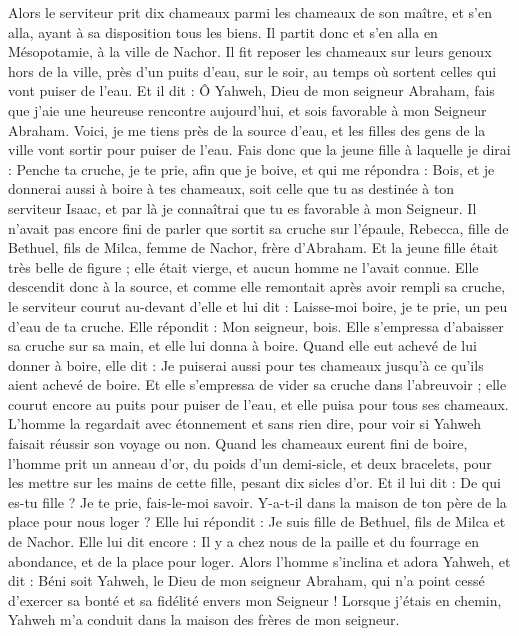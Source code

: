 \begin{multicols}{2}
Alors le serviteur prit dix chameaux parmi les chameaux de son maître, et s'en alla, ayant à sa disposition tous les biens. Il partit donc et s'en alla en Mésopotamie, à la ville de Nachor.
Il fit reposer les chameaux sur leurs genoux hors de la ville, près d'un puits d'eau, sur le soir, au temps où sortent celles qui vont puiser de l'eau.
Et il dit : Ô Yahweh, Dieu de mon seigneur Abraham, fais que j'aie une heureuse rencontre aujourd'hui, et sois favorable à mon Seigneur Abraham.
Voici, je me tiens près de la source d'eau, et les filles des gens de la ville vont sortir pour puiser de l'eau.
Fais donc que la jeune fille à laquelle je dirai : Penche ta cruche, je te prie, afin que je boive, et qui me répondra : Bois, et je donnerai aussi à boire à tes chameaux, soit celle que tu as destinée à ton serviteur Isaac, et par là je connaîtrai que tu es favorable à mon Seigneur.
Il n’avait pas encore fini de parler que sortit sa cruche sur l’épaule, Rebecca, fille de Bethuel, fils de Milca, femme de Nachor, frère d'Abraham.
Et la jeune fille était très belle de figure ; elle était vierge, et aucun homme ne l'avait connue. Elle descendit donc à la source, et comme elle remontait après avoir rempli sa cruche,
le serviteur courut au-devant d'elle et lui dit : Laisse-moi boire, je te prie, un peu d’eau de ta cruche.
Elle répondit : Mon seigneur, bois. Elle s’empressa d’abaisser sa cruche sur sa main,  et elle lui donna à boire.
Quand elle eut achevé de lui donner à boire, elle dit : Je puiserai aussi pour tes chameaux jusqu'à ce qu'ils aient achevé de boire.
Et elle s’empressa de vider sa cruche dans l’abreuvoir ; elle courut encore au puits pour puiser de l'eau, et elle puisa pour tous ses chameaux.
L’homme la regardait avec étonnement et sans rien dire, pour voir si Yahweh faisait réussir son voyage ou non.
Quand les chameaux eurent fini de boire, l’homme prit un anneau d'or, du poids d'un demi-sicle, et deux bracelets, pour les mettre sur les mains de cette fille, pesant dix sicles d'or.
Et il lui dit : De qui es-tu fille ? Je te prie, fais-le-moi savoir. Y-a-t-il dans la maison de ton père de la place pour nous loger ?
Elle lui répondit : Je suis fille de Bethuel, fils de Milca et de Nachor.
Elle lui dit encore : Il y a chez nous de la paille et du fourrage en abondance, et de la place pour loger.
Alors l’homme s'inclina et adora Yahweh,
et dit : Béni soit Yahweh, le Dieu de mon seigneur Abraham, qui n'a point cessé d'exercer sa bonté et sa fidélité envers mon Seigneur ! Lorsque j'étais en chemin, Yahweh m'a conduit dans la maison des frères de mon seigneur.

\end{multicols}
